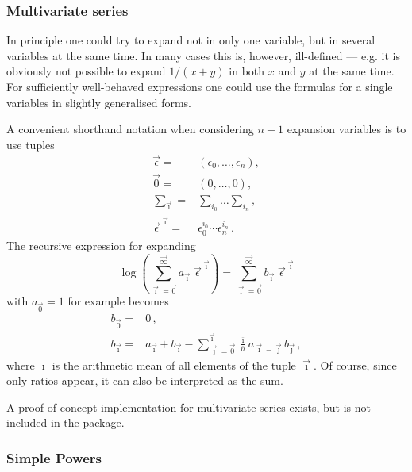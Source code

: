 \documentclass{article}
\begin{document}
\subsubsection{Multivariate series}
\label{sec:multi_var}

In principle one could try to expand not in only one variable, but in
several variables at the same time. In many cases this is, however,
ill-defined --- e.g. it is obviously not possible to expand $1/(x+y)$ in
both $x$ and $y$ at the same time. For sufficiently well-behaved
expressions one could use the formulas for a single variables in slightly
generalised forms. 

A convenient shorthand notation when considering $n+1$ expansion variables is to
use tuples 
\begin{align}
\label{eq:multivar_conv}
\vec{\epsilon}=&(\epsilon_0,\dots,\epsilon_n), \\
\vec{0}=&(0,\dots,0), \\
\sum_{\vec{\imath}}=&\sum_{i_0}\dots\sum_{i_n}, \\
\vec{\epsilon}^{\;\vec{\imath}} =& \epsilon_0^{i_0 }\cdots\epsilon_n^{i_n}\,.
\end{align}
The recursive expression for expanding
\begin{equation}
  \label{eq:log_multivar}
\log\left(\sum_{\vec{\imath}=\vec{0}}^{\vec{\infty}}a_{\vec{\imath}}\;
 \vec{\epsilon}^{\;\vec{\imath}}\right)=\sum_{\vec{\imath}=\vec{0}}^{\vec{\infty}} b_{\vec{\imath}}\;\vec{\epsilon}^{\;\vec{\imath}}
 \end{equation}
with $a_{\vec{0}}=1$ for example becomes
\begin{align}
  \label{eq:rec_log_multivar}
  b_{\vec{0}}=&0\,,\\
b_{\vec{\imath}}=&a_{\vec{\imath}}+b_{\vec{\imath}}-\sum_{\vec{\jmath}=\vec{0}}^{\vec{\imath}}
\frac{\overline{\imath}}{\overline{n}} a_{\vec{\imath}-\vec{\jmath}} b_{\vec{\jmath}}\,,
 \end{align}
where $\overline{\imath}$ is the arithmetic mean of all elements of the tuple
$\vec{\imath}$. Of course, since only ratios appear, it can also be
interpreted as the sum.

A proof-of-concept implementation for multivariate series exists, but is
not included in the package.

\subsubsection{Simple Powers}
\label{sec:impl_simpl_pow}
\end{document}
